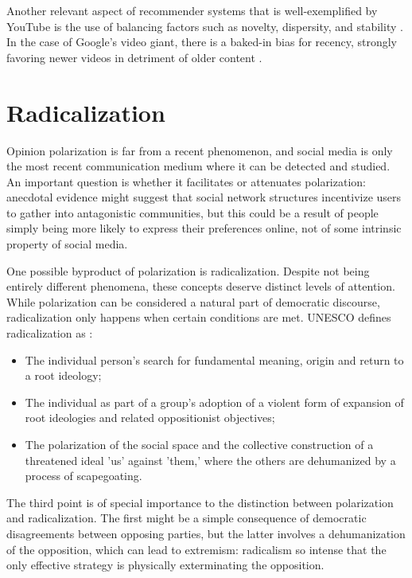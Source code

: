 Another relevant aspect of recommender systems that is well-exemplified by
YouTube is the use of balancing factors such as novelty, dispersity, and
stability \citep{zhao_recommending_2019}. In the case of Google's video giant,
there is a baked-in bias for recency, strongly favoring newer videos in
detriment of older content \citep{zhao_recommending_2019}.

\section{Radicalization}
\label{sec:radicalization}

Opinion polarization is far from a recent phenomenon, and social media is only
the most recent communication medium where it can be detected and studied. An
important question is whether it facilitates or attenuates polarization:
anecdotal evidence might suggest that social network structures incentivize
users to gather into antagonistic communities, but this could be a result of
people simply being more likely to express their preferences online, not of some
intrinsic property of social media.

One possible byproduct of polarization is radicalization. Despite not being
entirely different phenomena, these concepts deserve distinct levels of
attention. While polarization can be considered a natural part of democratic
discourse, radicalization only happens when certain conditions are met. UNESCO
defines radicalization as \citep{seraphin_youth_2017}:

\begin{itemize}
  \item The individual person's search for fundamental meaning, origin and
        return to a root ideology;
  \item The individual as part of a group's adoption of a violent form of
        expansion of root ideologies and related oppositionist objectives;
  \item The polarization of the social space and the collective construction of
        a threatened ideal 'us' against 'them,' where the others are dehumanized
        by a process of scapegoating.
\end{itemize}

The third point is of special importance to the distinction between polarization
and radicalization. The first might be a simple consequence of democratic
disagreements between opposing parties, but the latter involves a dehumanization
of the opposition, which can lead to extremism: radicalism so intense that the
only effective strategy is physically exterminating the opposition.

